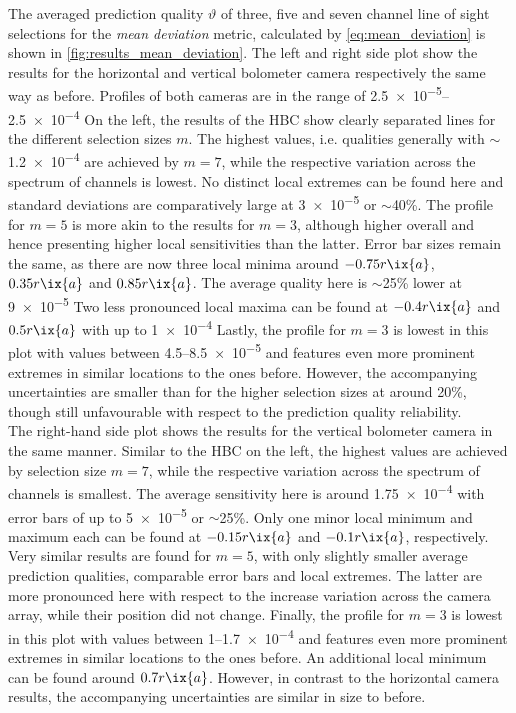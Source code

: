                 The averaged prediction quality $\vartheta$ of three, five and seven channel line of sight selections for the \textit{mean deviation} metric, calculated by \cref{eq:mean_deviation} is shown in \cref{fig:results_mean_deviation}. The left and right side plot show the results for the horizontal and vertical bolometer camera respectively the same way as before. Profiles of both cameras are in the range of \SIrange{2.5e-5}{2.5e-4}{\arbitraryunit} On the left, the results of the HBC show clearly separated lines for the different selection sizes $m$. The highest values, i.e. qualities generally with $\sim$\SI{1.2e-4}{\arbitraryunit} are achieved by $m=7$, while the respective variation across the spectrum of channels is lowest. No distinct local extremes can be found here and standard deviations are comparatively large at \SI{3e-5}{\arbitraryunit} or $\sim$40\%. The profile for $m=5$ is more akin to the results for $m=3$, although higher overall and hence presenting higher local sensitivities than the latter. Error bar sizes remain the same, as there are now three local minima around $-0.75r\ix{a}$, $0.35r\ix{a}$ and $0.85r\ix{a}$. The average quality here is $\sim$25\% lower at \SI{9e-5}{\arbitraryunit} Two less pronounced local maxima can be found at $-0.4r\ix{a}$ and $0.5r\ix{a}$ with up to \SI{1e-4}{\arbitraryunit} Lastly, the profile for $m=3$ is lowest in this plot with values between \SIrange{4.5}{8.5e-5}{\arbitraryunit} and features even more prominent extremes in similar locations to the ones before. However, the accompanying uncertainties are smaller than for the higher selection sizes at around 20\%, though still unfavourable with respect to the prediction quality reliability.\\%
                The right-hand side plot shows the results for the vertical bolometer camera in the same manner. Similar to the HBC on the left, the highest values are achieved by selection size $m=7$, while the respective variation across the spectrum of channels is smallest. The average sensitivity here is around \SI{1.75e-4}{\arbitraryunit} with error bars of up to \SI{5e-5}{\arbitraryunit} or $\sim$25\%. Only one minor local minimum and maximum each can be found at $-0.15r\ix{a}$ and $-0.1r\ix{a}$, respectively. Very similar results are found for $m=5$, with only slightly smaller average prediction qualities, comparable error bars and local extremes. The latter are more pronounced here with respect to the increase variation across the camera array, while their position did not change. Finally, the profile for $m=3$ is lowest in this plot with values between \SIrange{1}{1.7e-4}{\arbitraryunit} and features even more prominent extremes in similar locations to the ones before. An additional local minimum can be found around $0.7r\ix{a}$. However, in contrast to the horizontal camera results, the accompanying uncertainties are similar in size to before.\\%
